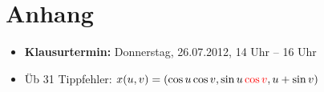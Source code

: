 \chapter*{Anhang}
\begin{itemize}
 \item \textbf{Klausurtermin:} Donnerstag, 26.07.2012, 14 Uhr – 16 Uhr
 \item Üb 31 Tippfehler: \(x(u,v) = (\cos u \cos v, \sin u \, {\color{red}\cos v}, u + \sin v)\)
\end{itemize}
